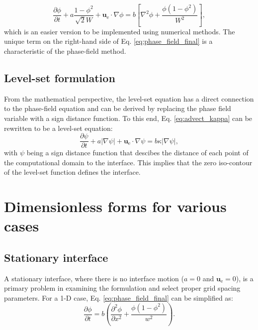 \begin{equation} \label{eq:phase_field_final}
\frac{\partial \phi}{\partial t}+a \frac{1-\phi^{2}}{\sqrt{2} W}+\boldsymbol{u}_{\mathrm{e}} \cdot \nabla \phi=b\left[\nabla^{2} \phi+\frac{\phi\left(1-\phi^{2}\right)}{W^{2}}\right],
\end{equation}
which is an easier version to be implemented using numerical methods. The unique term on the right-hand side of Eq. \ref{eq:phase_field_final} is a characteristic of the phase-field method.

\subsection{Level-set formulation}

From the mathematical perspective, the level-set equation has a direct connection to the phase-field equation and can be derived by replacing the phase field variable with a sign distance function. To this end, Eq. \ref{eq:advect_kappa} can be rewritten to be a level-set equation:
\begin{equation} \label{eq:ls_general}
\frac{\partial \psi}{\partial t}+a|\nabla \psi|+\boldsymbol{u}_{\mathrm{e}} \cdot \nabla \psi=b \kappa|\nabla \psi|,
\end{equation}
with $\psi$ being a sign distance function that descibes the distance of each point of the computational domain to the interface. This implies that the zero iso-contour of the level-set function defines the interface.

\section{Dimensionless forms for various cases}

\subsection{Stationary interface}

A stationary interface, where there is no interface motion ($a=0$ and $\boldsymbol{u}_{\mathrm{e}}=0$), is a primary problem in examining the formulation and select proper grid spacing parameters. For a 1-D case, Eq. \ref{eq:phase_field_final} can be simplified as:
\begin{equation} \label{eq:stationary_general}
\frac{\partial \phi}{\partial t}=b\left(\frac{\partial^{2} \phi}{\partial x^{2}}+\frac{\phi\left(1-\phi^{2}\right)}{w^{2}}\right).
\end{equation}

